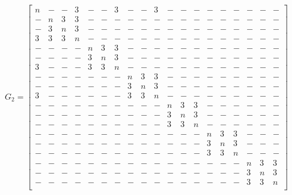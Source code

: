 \[G_2 = \left[\begin{smallmatrix}
n&-&-&3&-&-&3&-&-&3&-&-&-&-&-&-&-&-&-\\
-&n&3&3&-&-&-&-&-&-&-&-&-&-&-&-&-&-&-\\
-&3&n&3&-&-&-&-&-&-&-&-&-&-&-&-&-&-&-\\
3&3&3&n&-&-&-&-&-&-&-&-&-&-&-&-&-&-&-\\
-&-&-&-&n&3&3&-&-&-&-&-&-&-&-&-&-&-&-\\
-&-&-&-&3&n&3&-&-&-&-&-&-&-&-&-&-&-&-\\
3&-&-&-&3&3&n&-&-&-&-&-&-&-&-&-&-&-&-\\
-&-&-&-&-&-&-&n&3&3&-&-&-&-&-&-&-&-&-\\
-&-&-&-&-&-&-&3&n&3&-&-&-&-&-&-&-&-&-\\
3&-&-&-&-&-&-&3&3&n&-&-&-&-&-&-&-&-&-\\
-&-&-&-&-&-&-&-&-&-&n&3&3&-&-&-&-&-&-\\
-&-&-&-&-&-&-&-&-&-&3&n&3&-&-&-&-&-&-\\
-&-&-&-&-&-&-&-&-&-&3&3&n&-&-&-&-&-&-\\
-&-&-&-&-&-&-&-&-&-&-&-&-&n&3&3&-&-&-\\
-&-&-&-&-&-&-&-&-&-&-&-&-&3&n&3&-&-&-\\
-&-&-&-&-&-&-&-&-&-&-&-&-&3&3&n&-&-&-\\
-&-&-&-&-&-&-&-&-&-&-&-&-&-&-&-&n&3&3\\
-&-&-&-&-&-&-&-&-&-&-&-&-&-&-&-&3&n&3\\
-&-&-&-&-&-&-&-&-&-&-&-&-&-&-&-&3&3&n\\
\end{smallmatrix}\right]\]
